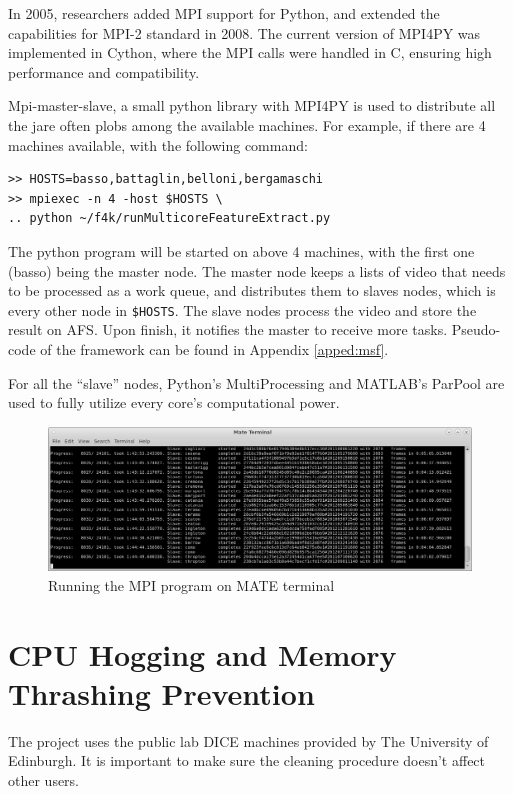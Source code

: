 \documentclass[bsc,logo,twoside,fullspacing,parskip]{infthesis}
\begin{document}
In 2005, researchers added MPI support for Python\cite{MPI4PY}, and extended the capabilities for MPI-2 standard in 2008\cite{MPI4PY2}. The current version of MPI4PY\cite{MPI4PY3} was implemented in Cython, where the MPI calls were handled in C, ensuring high performance and compatibility.

Mpi-master-slave\cite{L5}, a small python library with MPI4PY is used to distribute all the jare often plobs among the available machines. 
For example, if there are 4 machines available, with the following command: 
\lstset{basicstyle=\footnotesize\ttfamily,breaklines=true}
\begin{lstlisting}[frame=single]
>> HOSTS=basso,battaglin,belloni,bergamaschi
>> mpiexec -n 4 -host $HOSTS \
.. python ~/f4k/runMulticoreFeatureExtract.py
\end{lstlisting}
The python program will be started on above 4 machines, with the first one (basso) being the master node.
The master node keeps a lists of video that needs to be processed as a work queue, and distributes them to slaves nodes, which is every other node in {\tt \$HOSTS}. 
The slave nodes process the video and store the result on AFS. Upon finish, it notifies the master to receive more tasks. Pseudo-code of the framework can be found in Appendix \ref{apped:msf}.

For all the ``slave'' nodes, Python's MultiProcessing and MATLAB's ParPool are used to fully utilize every core's computational power.

\begin{figure}
    \centering
    \includegraphics[scale=0.30]{graph/sample_terminal.png}
    \caption{Running the MPI program on MATE terminal}
    \label{fig:mpi}
\end{figure}

\section{CPU Hogging and Memory Thrashing Prevention}

The project uses the public lab DICE machines provided by The University of Edinburgh. 
It is important to make sure the cleaning procedure doesn't affect other users.
\end{document}
